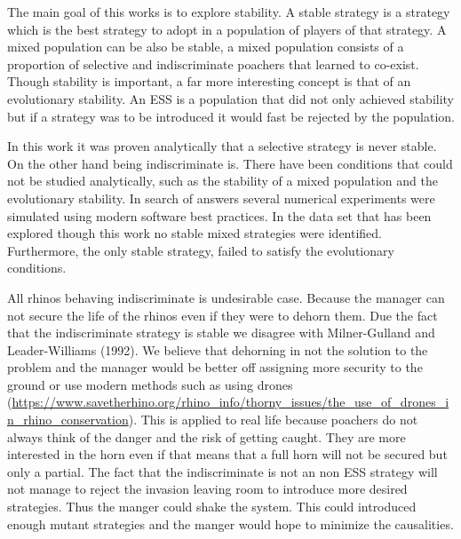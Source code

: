 \documentclass[10pt]{article}
\begin{document}
The main goal of this works is to explore stability. A stable strategy is a strategy
which is the best strategy to adopt in a population of players of that strategy. A mixed
population can be also be stable, a mixed population consists of a proportion
of selective and indiscriminate poachers that learned to co-exist. Though stability
is important, a far more interesting concept is that of an evolutionary stability.
An  ESS is a population that did not only achieved stability but  if a strategy
was to be introduced it would fast be rejected by the population.  

In this work it was proven analytically that a selective strategy is never stable. 
On the other hand being indiscriminate is. There have been conditions
that could not be studied analytically, such as the stability of a mixed 
population and the evolutionary stability. In search of answers several
numerical experiments were simulated using modern software best 
practices. In the data set that has been explored though this work no stable
mixed strategies were identified. Furthermore, the only stable strategy, failed
to satisfy the evolutionary conditions. 

All rhinos behaving indiscriminate is undesirable case. Because the manager can
not secure the life of the rhinos even if they were to dehorn them. Due the fact 
that the indiscriminate strategy is stable we disagree with Milner-Gulland and
Leader-Williams (1992). We believe that dehorning in not the 
solution to the problem and the manager would be better off assigning more 
security to the ground or use modern methods such as using drones
(\url{https://www.savetherhino.org/rhino_info/thorny_issues/the_use_of_drones_in_rhino_conservation}).
This is applied to real life because poachers 
do not always think of the danger and the risk of getting caught.
They are more interested in the horn even if that means that a full horn will
not be secured but only a partial. The fact that the indiscriminate is not
an non ESS strategy will not manage to reject the invasion leaving
room to introduce more desired strategies.
Thus the manger could shake  the system. This
could introduced enough mutant strategies and the manger would
hope to minimize the causalities.



\end{document}
